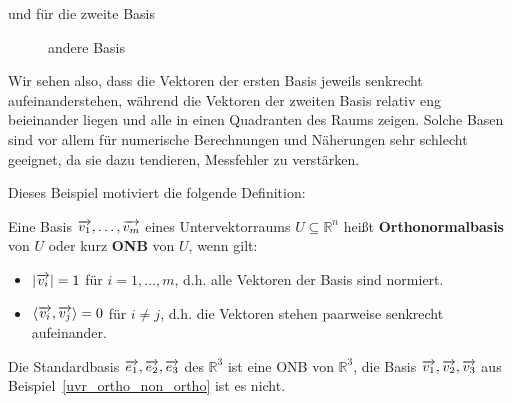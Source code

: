 \begin{beispiel}
und für die zweite Basis 


\begin{figure}[H]
	\vspace{-0.9cm}
	\begin{center}
	\begin{scaletikzpicturetowidth}{0.7\textwidth}
     		 
	\end{scaletikzpicturetowidth}
	\end{center}
	\vspace{-1.2cm}
	\caption[]{andere Basis}
\end{figure}


Wir sehen also, dass die Vektoren der ersten Basis jeweils senkrecht aufeinanderstehen, während die Vektoren 
der zweiten Basis relativ eng beieinander liegen und alle in einen Quadranten des Raums zeigen. Solche Basen 
sind vor allem für numerische Berechnungen und Näherungen sehr schlecht geeignet, da sie dazu tendieren, 
Messfehler zu verstärken. 
\end{beispiel}

Dieses Beispiel motiviert die folgende Definition:

\begin{definition} Eine Basis $\overrightarrow{v_1}, \ldots, \overrightarrow{v_m}$ eines Untervektorraums 
$U \subseteq \mathbb R^n$ heißt \textbf{Orthonormalbasis} von 
$U$ oder kurz \textbf{ONB} von $U$, wenn gilt:

\begin{itemize}
\item $\vert \overrightarrow{v_i} \vert = 1$ für $i = 1, \ldots, m$, d.h. alle Vektoren der Basis sind 
normiert.
\item $\langle \overrightarrow{v_i}, \overrightarrow{v_j} \rangle = 0$ für $i \neq j$, d.h. die Vektoren 
stehen paarweise senkrecht aufeinander.
\end{itemize}
\end{definition}

\begin{beispiel} Die Standardbasis $\overrightarrow{e_1}, \overrightarrow{e_2}, \overrightarrow{e_3}$ des 
$\mathbb R^3$ ist eine ONB von $\mathbb R^3$, die Basis $\overrightarrow{v_1}, \overrightarrow{v_2}, 
\overrightarrow{v_3}$ aus Beispiel~\ref{uvr_ortho_non_ortho} ist es nicht.
\end{beispiel}

